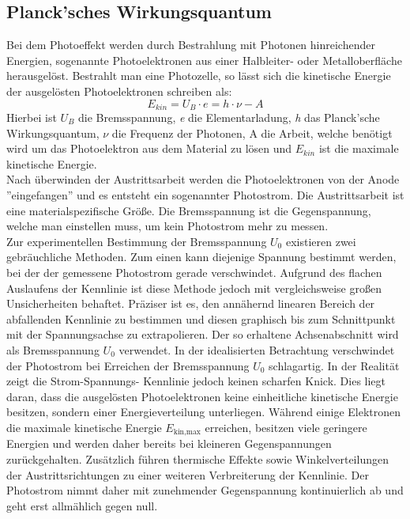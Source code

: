 \documentclass[a4paper,10pt,twocolumn]{scrartcl} %
\begin{document}
	\subsection{Planck'sches Wirkungsquantum}
		\label{sec:TheoPlanck}
		Bei dem Photoeffekt werden durch Bestrahlung mit Photonen hinreichender Energien, 
		sogenannte Photoelektronen aus einer Halbleiter- oder Metalloberfläche herausgelöst.
		Bestrahlt man eine Photozelle, so lässt sich die kinetische Energie der ausgelösten
		Photoelektronen schreiben als:
		\begin{equation}
			E_{kin} = U_B \cdot e = h \cdot \nu - A
		\label{eq:EinsteinGleichung}
		\end{equation}
		Hierbei ist $U_B$ die Bremsspannung, \textit{e} die Elementarladung, \textit{h} das Planck'sche Wirkungsquantum,
		$\nu$ die Frequenz der Photonen, A die Arbeit, welche benötigt wird um das Photoelektron 
		aus dem Material zu lösen und $E_{kin}$ ist die maximale kinetische Energie. \\
		Nach überwinden der Austrittsarbeit werden die Photoelektronen von der Anode
		''eingefangen'' und es entsteht ein sogenannter Photostrom. Die Austrittsarbeit ist eine 
		materialspezifische Größe. Die Bremsspannung
		ist die Gegenspannung, welche man einstellen muss, um kein Photostrom mehr zu messen. \\
		Zur experimentellen Bestimmung der Bremsspannung \( U_0 \) existieren zwei
		gebräuchliche Methoden. Zum einen kann diejenige Spannung bestimmt werden,
		bei der der gemessene Photostrom gerade verschwindet. Aufgrund des flachen
		Auslaufens der Kennlinie ist diese Methode jedoch mit vergleichsweise großen
		Unsicherheiten behaftet. Präziser ist es, den annähernd linearen Bereich der
		abfallenden Kennlinie zu bestimmen und diesen graphisch bis zum Schnittpunkt
		mit der Spannungsachse zu extrapolieren. Der so erhaltene Achsenabschnitt wird
		als Bremsspannung \( U_0 \) verwendet.
		In der idealisierten Betrachtung verschwindet der Photostrom bei Erreichen der
		Bremsspannung \( U_0 \) schlagartig. In der Realität zeigt die Strom-Spannungs-
		Kennlinie jedoch keinen scharfen Knick. Dies liegt daran, dass die ausgelösten
		Photoelektronen keine einheitliche kinetische Energie besitzen, sondern einer
		Energieverteilung unterliegen. Während einige Elektronen die maximale kinetische
		Energie \( E_{\text{kin,max}} \) erreichen, besitzen viele geringere Energien und
		werden daher bereits bei kleineren Gegenspannungen zurückgehalten. Zusätzlich
		führen thermische Effekte sowie Winkelverteilungen der Austrittsrichtungen zu
		einer weiteren Verbreiterung der Kennlinie. Der Photostrom nimmt daher mit
		zunehmender Gegenspannung kontinuierlich ab und geht erst allmählich gegen null.
\end{document}
